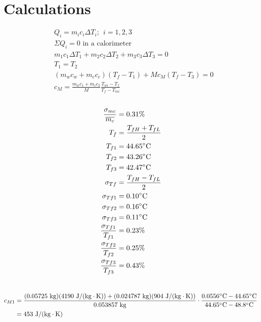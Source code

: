 \documentclass[12pt]{article}
\newcommand{\cel}{\mathrm{\degree C}}
\begin{document}
    \section{Calculations}
        \begin{equation}
            \begin{split}
                &Q_i = m_ic_i\Delta T_i;~~i = 1, 2, 3\\
                &\Sigma Q_i = 0 \text{ in a calorimeter}\\
                &m_1c_1\Delta T_1 + m_2c_2\Delta T_2 + m_3c_3\Delta T_3 = 0\\
                &T_1 = T_2\\
                &(m_wc_w+m_cc_c)(T_f-T_1) + Mc_M(T_f-T_3) = 0\\
                &c_M = \frac{m_wc_1+m_cc_2}{M}\frac{T_{wi}-T_f}{T_f-T_{mi}}
            \end{split}
        \end{equation}\\[12pt]
        \begin{equation}
            \begin{split}
                \frac{\sigma_{mc}}{\overline{m_c}} &= 0.31\% \\
                T_f &= \frac{T_{fH}+T_{fL}}{2}\\
                T_{f1}&=44.65 \mathrm{\degree C}\\
                T_{f2}&=43.26 \mathrm{\degree C}\\
                T_{f3}&=42.47 \mathrm{\degree C}\\
                \sigma_{Tf}&=\frac{T_{fH}-T_{fL}}{2}\\
                \sigma_{Tf1}&=0.10 \cel\\
                \sigma_{Tf2}&=0.16 \cel\\
                \sigma_{Tf3}&=0.11 \cel\\
                \frac{\sigma_{Tf1}}{T_{f1}} &= 0.23\% \\
                \frac{\sigma_{Tf2}}{T_{f2}} &= 0.25\% \\
                \frac{\sigma_{Tf3}}{T_{f3}} &= 0.43\% \\
            \end{split}
        \end{equation}\\[12pt]
        \begin{equation}
            \begin{split} 
                c_{M1} &= \frac{(0.05725 \text{ kg})(4190~\mathrm{J/(kg\cdot K)})+(0.024787 \text{ kg})(904~\mathrm{J/(kg\cdot K)})}{0.053857 \text{ kg}} \cdot \frac{0.0556 \cel - 44.65 \cel }{44.65 \cel - 48.8 \cel}\\
                &= 453~\mathrm{J/(kg\cdot K)}\\
            \end{split}
        \end{equation}\\[12pt]
\end{document}
